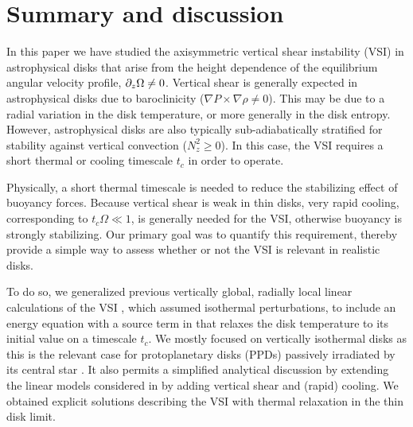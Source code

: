 \section{Summary and discussion}\label{summary}
In this paper we have studied the axisymmetric vertical shear 
instability (VSI) in astrophysical disks that arise from the 
height dependence of the equilibrium angular velocity profile,  
$\partial_z\Omega\neq 0$. Vertical shear is generally
expected in astrophysical disks due to baroclinicity ($\nabla
P\times\nabla \rho \neq 0$). This may be due
to a radial variation in the disk temperature, or more generally in
the disk entropy. However, astrophysical disks are also typically
sub-adiabatically stratified for stability against vertical
convection ($N_z^2\geq 0$). In this case, the VSI requires a short
thermal or cooling timescale $t_c$ in order to operate.  

Physically, a short thermal timescale is needed to reduce the  
stabilizing effect of buoyancy forces. Because vertical shear is weak
in thin disks, very rapid cooling, corresponding to $t_c\Omega\ll 1$, 
is generally needed for the VSI, otherwise buoyancy is strongly
stabilizing. Our primary goal was to quantify this requirement,
thereby provide a simple way to assess whether or not the VSI is
relevant in realistic disks.  

To do so, we generalized previous vertically global, radially local linear 
calculations of the VSI , which
assumed isothermal perturbations, to include an energy equation with 
a source term in that relaxes the disk 
temperature to its initial value on a timescale
$t_c$. 
We mostly focused on vertically isothermal disks as this is the
relevant case for protoplanetary disks (PPDs) passively 
irradiated by its central star \citep{chiang97}. It also permits a
simplified analytical discussion by extending the 
linear models considered in \cite{lubow93} by adding vertical shear
and (rapid) cooling. We obtained explicit solutions 
describing the VSI with thermal relaxation in the thin disk limit.  


